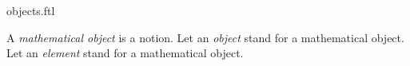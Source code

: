 \documentclass{stex}
\begin{document}
\begin{smodule}{objects.ftl}

\begin{fakeforthel}
  \begin{signature*}
    A \emph{mathematical object} is a notion.
    Let an \emph{object} stand for a mathematical object.
    Let an \emph{element} stand for a mathematical object.
  \end{signature*}
\end{fakeforthel}

\end{smodule}
\end{document}
